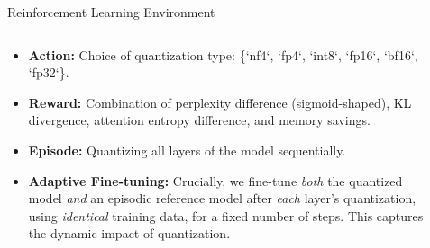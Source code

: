 \documentclass[final]{beamer}
\newlength{\sepwidth}
\newlength{\colwidth}
\newcommand{\separatorcolumn}{\begin{column}{\sepwidth}\end{column}}
\begin{document}
\begin{frame}[t]
\begin{columns}[t]
\begin{column}{\colwidth}
\begin{block}{Reinforcement Learning Environment}
\begin{columns}[T]
\begin{column}{0.4\linewidth}
\begin{itemize}
								\item \textbf{Action:} Choice of quantization type: \{`nf4`, `fp4`, `int8`, `fp16`, `bf16`, `fp32`\}.
								\item \textbf{Reward:} Combination of perplexity difference (sigmoid-shaped), KL divergence, attention entropy difference, and memory savings.
								\item \textbf{Episode:} Quantizing all layers of the model sequentially.
								\item \textbf{Adaptive Fine-tuning:} Crucially, we fine-tune \emph{both} the quantized model \emph{and} an episodic reference model after \emph{each} layer's quantization, using \emph{identical} training data, for a fixed number of steps. This captures the dynamic impact of quantization.
							\end{itemize}
						\end{column}
					\end{columns}
				\end{block}
				
			\end{column}
			
			\separatorcolumn
			
			\begin{column}{\colwidth}
				

\end{column}
\end{columns}
\end{frame}
\end{document}
